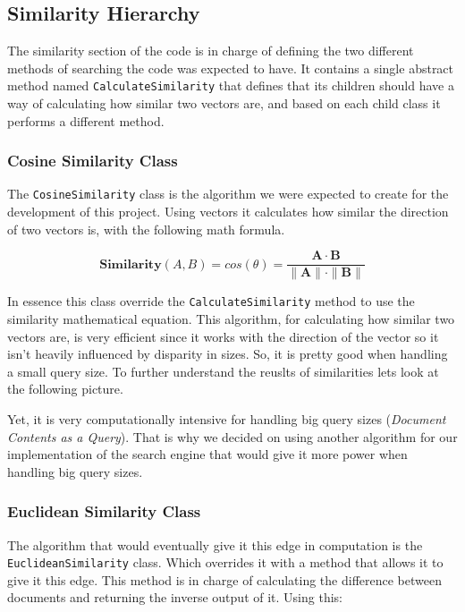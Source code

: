 \documentclass{article}
\begin{document}
\subsection{Similarity Hierarchy}
The similarity section of the code is in charge of defining the two different methods of searching the code was expected to have. It contains a single abstract method named \texttt{CalculateSimilarity} that defines that its children should have a way of calculating how similar two vectors are, and based on each child class it performs a different method.
\subsubsection{Cosine Similarity Class}
The \texttt{CosineSimilarity} class is the algorithm we were expected to create for the development of this project. Using vectors it calculates how similar the direction of two vectors is, with the following math formula.

\begin{center}
    \[
        \textbf{Similarity}(A, B) = cos(\theta) = \frac{\mathbf{A} \cdot \mathbf{B}}{\|\mathbf{A}\| \cdot \|\mathbf{B}\|}
    \]
\end{center}

\indent In essence this class override the \texttt{CalculateSimilarity} method to use the similarity mathematical equation. This algorithm, for calculating how similar two vectors are, is very efficient since it works with the direction of the vector so it isn't heavily influenced by disparity in sizes. So, it is pretty good when handling a small query size. To further understand the reuslts of similarities lets look at the following picture.

Yet, it is very computationally intensive for handling big query sizes (\textit{Document Contents as a Query}). That is why we decided on using another algorithm for our implementation of the search engine that would give it more power when handling big query sizes. 

\subsubsection{Euclidean Similarity Class}
The algorithm that would eventually give it this edge in computation is the \texttt{EuclideanSimilarity} class. Which overrides it with a method that allows it to give it this edge. This method is in charge of calculating the difference between documents and returning the inverse output of it. Using this:
\end{document}

